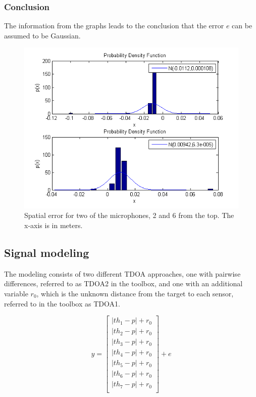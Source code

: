 \documentclass[11pt]{article}
\begin{document}
\subsubsection{Conclusion}
The information from the graphs leads to the conclusion that the error $e$ can be assumed to be Gaussian.

\begin{figure}
\begin{center}
  \includegraphics[width=\textwidth]{calibration_ndist_2_and_6.png}
  \caption{Spatial error for two of the microphones, 2 and 6 from the top. The x-axis is in meters.}
  \end{center}
\end{figure}


\subsection{Signal modeling}
The modeling consists of two different TDOA approaches, one with pairwise differences, referred to as TDOA2 in the toolbox, and one with an additional variable $r_0$, which is the unknown distance from the target to each sensor, referred to in the toolbox as  TDOA1.

\[
  y = 
  \begin{bmatrix}
    |th_1 - p| + r_0 \\ 
    |th_2 - p| + r_0 \\ 
    |th_3 - p| + r_0 \\ 
    |th_4 - p| + r_0 \\ 
    |th_5 - p| + r_0 \\ 
    |th_6 - p| + r_0 \\ 
    |th_7 - p| + r_0 \\ 
  \end{bmatrix} + e
\] 
\end{document}
